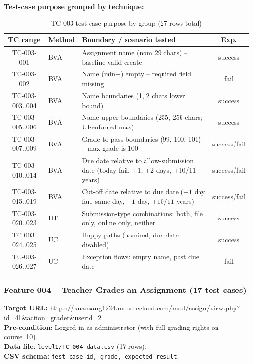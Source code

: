 \documentclass[twoside,final]{hcmut-report}
\begin{document}
\textbf{Test-case purpose grouped by technique:}
\begin{table}[H]
\centering
\renewcommand{\arraystretch}{1.2}
\begin{tabularx}{\textwidth}{|c|l|X|c|}
\hline
\textbf{TC range} & \textbf{Method} & \textbf{Boundary / scenario tested} & \textbf{Exp.} \\ \hline
TC-003-001 & BVA & Assignment name (nom 29 chars) -- baseline valid create & success \\ \hline
TC-003-002 & BVA & Name (min$-$) empty -- required field missing & fail \\ \hline
TC-003-003..004 & BVA & Name boundaries (1, 2 chars lower bound) & success \\ \hline
TC-003-005..006 & BVA & Name upper boundaries (255, 256 chars; UI-enforced max) & success \\ \hline
TC-003-007..009 & BVA & Grade-to-pass boundaries (99, 100, 101) -- max grade is 100 & success/fail \\ \hline
TC-003-010..014 & BVA & Due date relative to allow-submission date (today fail, +1, +2 days, +10/11 years) & success/fail \\ \hline
TC-003-015..019 & BVA & Cut-off date relative to due date ($-1$ day fail, same day, $+1$ day, $+10$/$11$ years) & success/fail \\ \hline
TC-003-020..023 & DT & Submission-type combinations: both, file only, online only, neither & success \\ \hline
TC-003-024..025 & UC & Happy paths (nominal, due-date disabled) & success \\ \hline
TC-003-026..027 & UC & Exception flows: empty name, past due date & fail \\ \hline
\end{tabularx}
\caption{TC-003 test case purpose by group (27 rows total)}
\end{table}

\subsubsection{Feature 004 -- Teacher Grades an Assignment (17 test cases)}

\textbf{Target URL:} \url{https://xuansang1234.moodlecloud.com/mod/assign/view.php?id=41&action=grader&userid=2}\\
\textbf{Pre-condition:} Logged in as administrator (with full grading rights on course~10).\\
\textbf{Data file:} \texttt{level1/TC-004\_data.csv} (17 rows).\\
\textbf{CSV schema:} \texttt{test\_case\_id, grade, expected\_result}.
\end{document}
